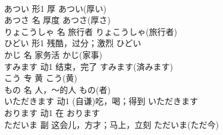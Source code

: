 \documentclass[8pt]{extreport}
\begin{document}
\begin{CJK}{UTF8}{min}
\\	あつい	形1	厚	あつい(厚い)	
\\	あつさ	名	厚度	あつさ(厚さ)	
\\	りょこうしゃ	名	旅行者	りょこうしゃ(旅行者)	
\\	ひどい	形1	残酷，过分；激烈	ひどい	
\\	かじ	名	家务活	かじ(家事)	
\\	すみます	动1	结束，完了	すみます(済みます)	
\\	こう	专	黄	こう(黄)	
\\	もの	名	人，～的人	もの(者)	
\\	いただきます	动1	(自谦)吃，喝；得到	いただきます	
\\	おります	动1	在	おります	
\\	ただいま	副	这会儿，方才；马上，立刻	ただいま(ただ今)	
\end{CJK}
\end{document}
